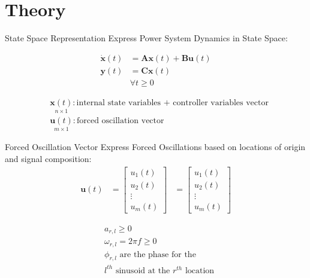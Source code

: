 \section[Theory]{Theory}
\label{sec:lasso_theory}

\begin{frame}[fragile]{State Space Representation}
	Express Power System Dynamics in State Space:

	\begin{align*}
		\dot{\textbf{x}}(t) &= 
		\textbf{A}\textbf{x}(t)
		+ \textbf{B}\textbf{u}(t)\\
		\textbf{y}(t) &= 
		\textbf{C}\textbf{x}(t)\\  
		& \forall t\geq0	
	\end{align*}
	
	\begin{align*}
		& \underset{\scriptscriptstyle n\times 1}{\textbf{x}(t)} : \text{internal state variables + controller variables vector}                                                                      \\
		& \underset{\scriptscriptstyle m\times 1}{\textbf{u}(t)} : \text{forced oscillation vector}
	\end{align*}
\end{frame}

\begin{frame}[fragile]{Forced Oscillation Vector}
	Express Forced Oscillations based on locations of origin and signal composition:
	\begin{align*}
		\textbf{u}(t) 
		&= 
		\begin{bmatrix}
			u_1(t) \\
			u_2(t) \\
			\vdots \\
			u_m(t)
		\end{bmatrix} 
		&=	
		\begin{bmatrix}
			u_1(t) \\
			u_2(t) \\
			\vdots \\
			u_m(t)
		\end{bmatrix} 
	\end{align*}
	
	\begin{align*}
		& a_{r,l} \geq0 \\
		& \omega_{r,l} = 2\pi f \geq 0 \\
		& \phi_{r,l} \text{ are the phase for the} \\
		& l^{th} \text{ sinusoid at the }  r^{th} \text{ location}
	\end{align*}

\end{frame}